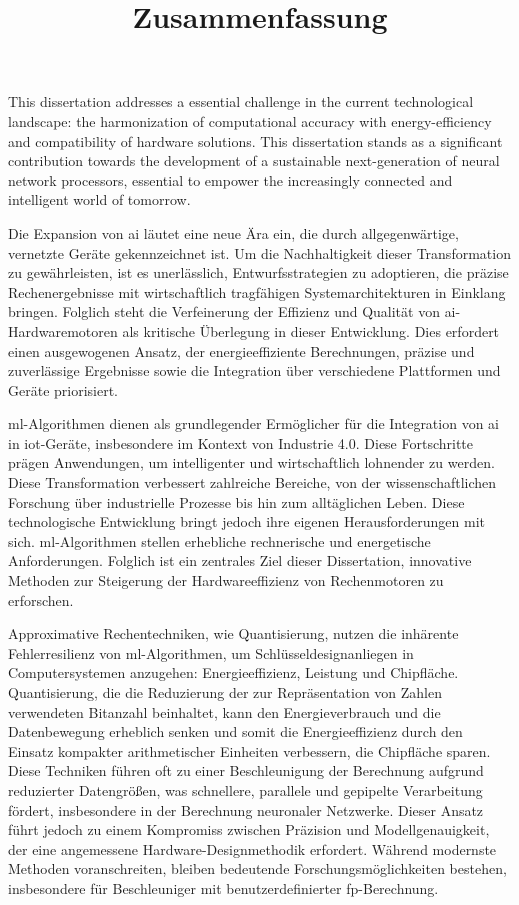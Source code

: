 \documentclass{article}
\begin{document}
This dissertation addresses a essential challenge in the current technological landscape: the harmonization of computational accuracy with energy-efficiency and compatibility of hardware solutions. This dissertation stands as a significant contribution towards the development of a sustainable next-generation of neural network processors, essential to empower the increasingly connected and intelligent world of tomorrow.

\newpage
\title{\textbf{Zusammenfassung}}

\thispagestyle{empty}

Die Expansion von \gls{ai} l\"autet eine neue \"Ara ein, die durch allgegenw\"artige, vernetzte Ger\"ate gekennzeichnet ist. Um die Nachhaltigkeit dieser Transformation zu gew\"ahrleisten, ist es unerl\"asslich, Entwurfsstrategien zu adoptieren, die pr\"azise Rechenergebnisse mit wirtschaftlich tragf\"ahigen Systemarchitekturen in Einklang bringen. Folglich steht die Verfeinerung der Effizienz und Qualit\"at von \gls{ai}-Hardwaremotoren als kritische \"Uberlegung in dieser Entwicklung. Dies erfordert einen ausgewogenen Ansatz, der energieeffiziente Berechnungen, pr\"azise und zuverl\"assige Ergebnisse sowie die Integration \"uber verschiedene Plattformen und Ger\"ate priorisiert.

\gls{ml}-Algorithmen dienen als grundlegender Erm\"oglicher f\"ur die Integration von \gls{ai} in \gls{iot}-Ger\"ate, insbesondere im Kontext von Industrie 4.0. Diese Fortschritte pr\"agen Anwendungen, um intelligenter und wirtschaftlich lohnender zu werden. Diese Transformation verbessert zahlreiche Bereiche, von der wissenschaftlichen Forschung \"uber industrielle Prozesse bis hin zum allt\"aglichen Leben. Diese technologische Entwicklung bringt jedoch ihre eigenen Herausforderungen mit sich. \gls{ml}-Algorithmen stellen erhebliche rechnerische und energetische Anforderungen. Folglich ist ein zentrales Ziel dieser Dissertation, innovative Methoden zur Steigerung der Hardwareeffizienz von Rechenmotoren zu erforschen.

Approximative Rechentechniken, wie Quantisierung, nutzen die inh\"arente Fehlerresilienz von \gls{ml}-Algorithmen, um Schl\"usseldesignanliegen in Computersystemen anzugehen: Energieeffizienz, Leistung und Chipfl\"ache. Quantisierung, die die Reduzierung der zur Repr\"asentation von Zahlen verwendeten Bitanzahl beinhaltet, kann den Energieverbrauch und die Datenbewegung erheblich senken und somit die Energieeffizienz durch den Einsatz kompakter arithmetischer Einheiten verbessern, die Chipfl\"ache sparen. Diese Techniken f\"uhren oft zu einer Beschleunigung der Berechnung aufgrund reduzierter Datengr\"o\ss{}en, was schnellere, parallele und gepipelte Verarbeitung f\"ordert, insbesondere in der Berechnung neuronaler Netzwerke. Dieser Ansatz f\"uhrt jedoch zu einem Kompromiss zwischen Pr\"azision und Modellgenauigkeit, der eine angemessene Hardware-Designmethodik erfordert. W\"ahrend modernste Methoden voranschreiten, bleiben bedeutende Forschungsm\"oglichkeiten bestehen, insbesondere f\"ur Beschleuniger mit benutzerdefinierter \gls{fp}-Berechnung.
\end{document}
